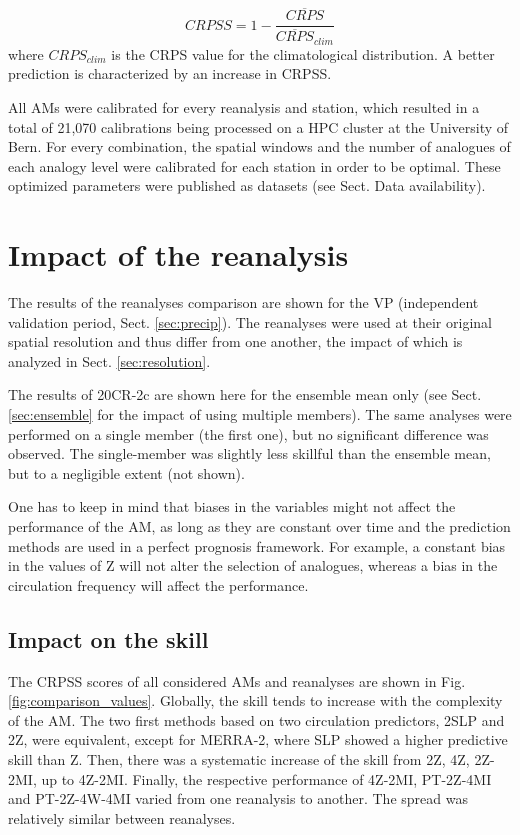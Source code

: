 \documentclass[smallextended]{svjour3}       %
\begin{document}
	\begin{equation}
	\label{eq:CRPSS}
	CRPSS = 1-\frac{\overline{CRPS}}{\overline{CRPS}_{clim}}
	\end{equation}
	where $CRPS_{clim}$ is the CRPS value for the climatological distribution. A better prediction is characterized by an increase in CRPSS.
	
	All AMs were calibrated for every reanalysis and station, which resulted in a total of 21,070 calibrations being processed on a HPC cluster at the University of Bern. For every combination, the spatial windows and the number of analogues of each analogy level were calibrated for each station in order to be optimal. These optimized parameters were published as datasets (see Sect. Data availability).
	
	
	\section{Impact of the reanalysis}
	\label{sec:influence}
	
	The results of the reanalyses comparison are shown for the VP (independent validation period, Sect. \ref{sec:precip}). The reanalyses were used at their original spatial resolution and thus differ from one another, the impact of which is analyzed in Sect. \ref{sec:resolution}.
	
	The results of 20CR-2c are shown here for the ensemble mean only (see Sect. \ref{sec:ensemble} for the impact of using multiple members). The same analyses were performed on a single member (the first one), but no significant difference was observed. The single-member was slightly less skillful than the ensemble mean, but to a negligible extent (not shown).
	
	One has to keep in mind that biases in the variables might not affect the performance of the AM, as long as they are constant over time and the prediction methods are used in a perfect prognosis framework. For example, a constant bias in the values of Z will not alter the selection of analogues, whereas a bias in the circulation frequency will affect the performance.
	
	
	\subsection{Impact on the skill}
	
	The CRPSS scores of all considered AMs and reanalyses are shown in Fig. \ref{fig:comparison_values}. Globally, the skill tends to increase with the complexity of the AM. The two first methods based on two circulation predictors, 2SLP and 2Z, were equivalent, except for MERRA-2, where SLP showed a higher predictive skill than Z. Then, there was a systematic increase of the skill from 2Z, 4Z, 2Z-2MI, up to 4Z-2MI. Finally, the respective performance of 4Z-2MI, PT-2Z-4MI and PT-2Z-4W-4MI varied from one reanalysis to another. The spread was relatively similar between reanalyses.
	
\end{document}
